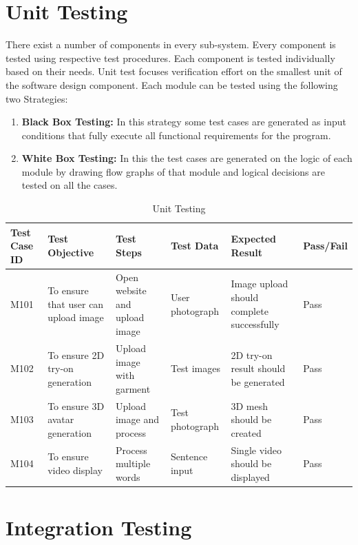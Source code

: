 \documentclass[12pt,a4paper,oneside]{report}
\begin{document}
\section{Unit Testing}

There exist a number of components in every sub-system. Every component is tested using respective test procedures. Each component is tested individually based on their needs. Unit test focuses verification effort on the smallest unit of the software design component. Each module can be tested using the following two Strategies:

\begin{enumerate}
    \item \textbf{Black Box Testing:} In this strategy some test cases are generated as input conditions that fully execute all functional requirements for the program.
    \item \textbf{White Box Testing:} In this the test cases are generated on the logic of each module by drawing flow graphs of that module and logical decisions are tested on all the cases.
\end{enumerate}

\begin{table}[H]
\centering
\caption{Unit Testing}
\label{tab:unit-testing}
\begin{tabular}{|p{1.5cm}|p{1.5cm}|p{1.5cm}|p{1.5cm}|p{1.5cm}|p{1.5cm}|}
\hline
\textbf{Test Case ID} & \textbf{Test Objective} & \textbf{Test Steps} & \textbf{Test Data} & \textbf{Expected Result} & \textbf{Pass/Fail} \\
\hline
M101 & To ensure that user can upload image & Open website and upload image & User photograph & Image upload should complete successfully & Pass \\
\hline
M102 & To ensure 2D try-on generation & Upload image with garment & Test images & 2D try-on result should be generated & Pass \\
\hline
M103 & To ensure 3D avatar generation & Upload image and process & Test photograph & 3D mesh should be created & Pass \\
\hline
M104 & To ensure video display & Process multiple words & Sentence input & Single video should be displayed & Pass \\
\hline
\end{tabular}
\end{table}

\section{Integration Testing}
\end{document}
